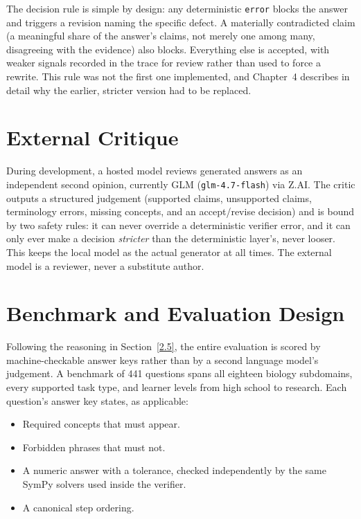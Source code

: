 The decision rule is simple by design: any deterministic \texttt{error}
blocks the answer and triggers a revision naming the specific defect. A
materially contradicted claim (a meaningful share of the answer's claims,
not merely one among many, disagreeing with the evidence) also blocks.
Everything else is accepted, with weaker signals recorded in the trace for
review rather than used to force a rewrite. This rule was not the first one
implemented, and Chapter~4 describes in detail why the earlier, stricter
version had to be replaced.

\section{External Critique}\label{3.7}

During development, a hosted model reviews generated answers as an
independent second opinion, currently GLM (\texttt{glm-4.7-flash}) via
Z.AI. The critic outputs a structured judgement (supported claims, unsupported claims,
terminology errors, missing concepts, and an accept/revise decision) and
is bound by two safety rules: it can never override a deterministic
verifier error, and it can only ever make a decision \emph{stricter} than
the deterministic layer's, never looser. This keeps the local model as the
actual generator at all times. The external model is a reviewer, never a
substitute author.

\section{Benchmark and Evaluation Design}\label{3.8}

Following the reasoning in Section~\ref{2.5}, the entire evaluation is
scored by machine-checkable answer keys rather than by a second language
model's judgement. A benchmark of 441 questions spans all eighteen
biology subdomains, every supported task type, and learner levels from
high school to research. Each question's answer key states, as
applicable:

\begin{itemize}
\item Required concepts that must appear.
\item Forbidden phrases that must not.
\item A numeric answer with a tolerance, checked independently by the
same SymPy solvers used inside the verifier.
\item A canonical step ordering.
\end{itemize}

